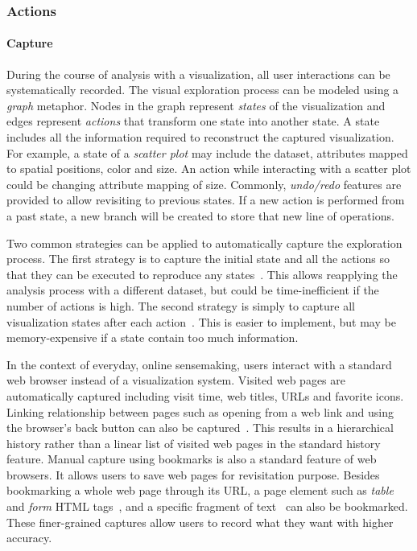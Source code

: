 \subsubsection{Actions}

\paragraph{Capture}
During the course of analysis with a visualization, all user interactions can be systematically recorded. The visual exploration process can be modeled using a \textit{graph} metaphor. Nodes in the graph represent \textit{states} of the visualization and edges represent \textit{actions} that transform one state into another state. A state includes all the information required to reconstruct the captured visualization. For example, a state of a \textit{scatter plot} may include the dataset, attributes mapped to spatial positions, color and size. An action while interacting with a scatter plot could be changing attribute mapping of size. Commonly, \emph{undo/redo} features are provided to allow revisiting to previous states. If a new action is performed from a past state, a new branch will be created to store that new line of operations. 

Two common strategies can be applied to automatically capture the exploration process. The first strategy is to capture the initial state and all the actions so that they can be executed to reproduce any states~\cite{Kadivar2009}. This allows reapplying the analysis process with a different dataset, but could be time-inefficient if the number of actions is high. The second strategy is simply to capture all visualization states after each action~\cite{Bavoil2005}. This is easier to implement, but may be memory-expensive if a state contain too much information.

In the context of everyday, online sensemaking, users interact with a standard web browser instead of a visualization system. Visited web pages are automatically captured including visit time, web titles, URLs and favorite icons. Linking relationship between pages such as opening from a web link and using the browser's back button can also be captured~\cite{Ayers1995,Hightower1998,Milic-Frayling2003}. This results in a hierarchical history rather than a linear list of visited web pages in the standard history feature. Manual capture using bookmarks is also a standard feature of web browsers. It allows users to save web pages for revisitation purpose. Besides bookmarking a whole web page through its URL, a page element such as \textit{table} and \textit{form} HTML tags~\cite{Hong2008}, and a specific fragment of text~\cite{Dontcheva2006} can also be bookmarked. These finer-grained captures allow users to record what they want with higher accuracy. 

